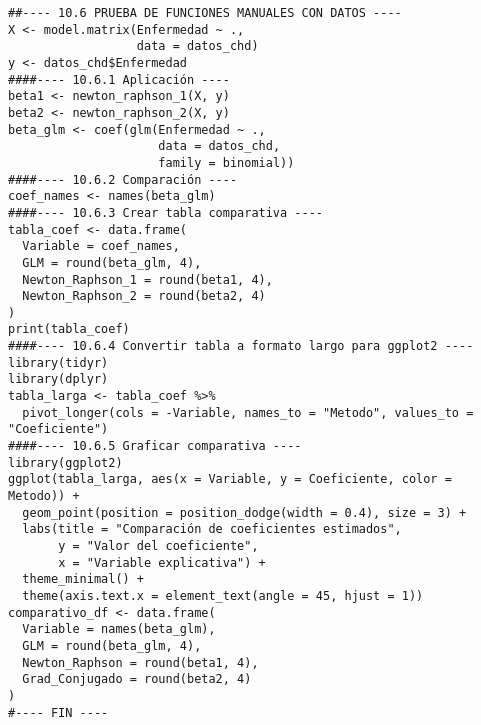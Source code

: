 \documentclass[12pt]{article}
\begin{document}
\begin{verbatim}
##---- 10.6 PRUEBA DE FUNCIONES MANUALES CON DATOS ----
X <- model.matrix(Enfermedad ~ ., 
                  data = datos_chd)
y <- datos_chd$Enfermedad
####---- 10.6.1 Aplicación ----
beta1 <- newton_raphson_1(X, y)
beta2 <- newton_raphson_2(X, y)
beta_glm <- coef(glm(Enfermedad ~ ., 
                     data = datos_chd,
                     family = binomial))
####---- 10.6.2 Comparación ----
coef_names <- names(beta_glm)
####---- 10.6.3 Crear tabla comparativa ----
tabla_coef <- data.frame(
  Variable = coef_names,
  GLM = round(beta_glm, 4),
  Newton_Raphson_1 = round(beta1, 4),
  Newton_Raphson_2 = round(beta2, 4)
)
print(tabla_coef)
####---- 10.6.4 Convertir tabla a formato largo para ggplot2 ----
library(tidyr)
library(dplyr)
tabla_larga <- tabla_coef %>%
  pivot_longer(cols = -Variable, names_to = "Metodo", values_to = "Coeficiente")
####---- 10.6.5 Graficar comparativa ----
library(ggplot2)
ggplot(tabla_larga, aes(x = Variable, y = Coeficiente, color = Metodo)) +
  geom_point(position = position_dodge(width = 0.4), size = 3) +
  labs(title = "Comparación de coeficientes estimados",
       y = "Valor del coeficiente",
       x = "Variable explicativa") +
  theme_minimal() +
  theme(axis.text.x = element_text(angle = 45, hjust = 1))
comparativo_df <- data.frame(
  Variable = names(beta_glm),
  GLM = round(beta_glm, 4),
  Newton_Raphson = round(beta1, 4),
  Grad_Conjugado = round(beta2, 4)
)
#---- FIN ----


\end{verbatim}
\end{document}
